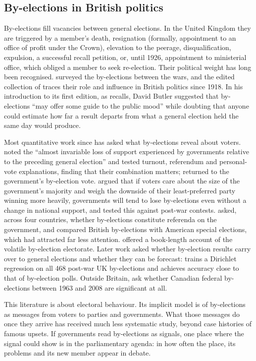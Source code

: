 \documentclass[11pt,a4paper]{article}
\begin{document}
\subsection{By-elections in British politics}
By-elections fill vacancies between general elections. In the United Kingdom they are triggered by a member's death, resignation (formally, appointment to an office of profit under the Crown), elevation to the peerage, disqualification, expulsion, a successful recall petition, or, until 1926, appointment to ministerial office, which obliged a member to seek re-election. Their political weight has long been recognised. \citet{pollock1941} surveyed the by-elections between the wars, and the edited collection of \citet{cook1997} traces their role and influence in British politics since 1918. In his introduction to its first edition, as \citet{upton1991} recalls, David Butler suggested that by-elections ``may offer some guide to the public mood'' while doubting that anyone could estimate how far a result departs from what a general election held the same day would produce.

Most quantitative work since has asked what by-elections reveal about voters. \citet{mughan1986} noted the ``almost invariable loss of support experienced by governments relative to the preceding general election'' and tested turnout, referendum and personal-vote explanations, finding that their combination matters; \citet{mughan1988} returned to the government's by-election vote. \citet{price1998} argued that if voters care about the size of the government's majority and weigh the downside of their least-preferred party winning more heavily, governments will tend to lose by-elections even without a change in national support, and tested this against post-war contests. \citet{feigert1990} asked, across four countries, whether by-elections constitute referenda on the government, and \citet{studlar1987} compared British by-elections with American special elections, which had attracted far less attention. \citet{norris1990} offered a book-length account of the volatile by-election electorate. Later work asked whether by-election results carry over to general elections \citep{upton1991} and whether they can be forecast: \citet{hanretty2021} trains a Dirichlet regression on all 468 post-war UK by-elections and achieves accuracy close to that of by-election polls. Outside Britain, \citet{loewen2010} ask whether Canadian federal by-elections between 1963 and 2008 are significant at all.

This literature is about electoral behaviour. Its implicit model is of by-elections as messages from voters to parties and governments. What those messages do once they arrive has received much less systematic study, beyond case histories of famous upsets. If governments read by-elections as signals, one place where the signal could show is in the parliamentary agenda: in how often the place, its problems and its new member appear in debate.
\end{document}
